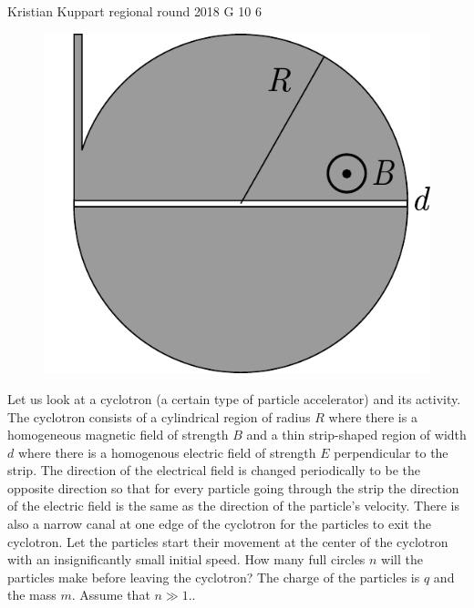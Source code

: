 \documentclass[11pt]{article}
\begin{document}
{Kristian Kuppart} %
{regional round} %
{2018} %
{G 10} %
{6} %
{

\ifEngStatement
\begin{figure}
	\begin{center}
		\includegraphics[width=\linewidth]{2018-v2g-10-tsyklotron}
	\end{center}
\end{figure}
Let us look at a cyclotron (a certain type of particle accelerator) and its activity. The cyclotron consists of a cylindrical region of radius $R$ where there is a homogeneous magnetic field of strength $B$ and a thin strip-shaped region of width $d$ where there is a homogenous electric field of strength $E$ perpendicular to the strip. The direction of the electrical field is changed periodically to be the opposite direction so that for every particle going through the strip the direction of the electric field is the same as the direction of the particle’s velocity. There is also a narrow canal at one edge of the cyclotron for the particles to exit the cyclotron. Let the particles start their movement at the center of the cyclotron with an insignificantly small initial speed. How many full circles $n$ will the particles make before leaving the cyclotron? The charge of the particles is $q$ and the mass $m$. Assume that $n\gg 1.$.
\fi
}
\end{document}
